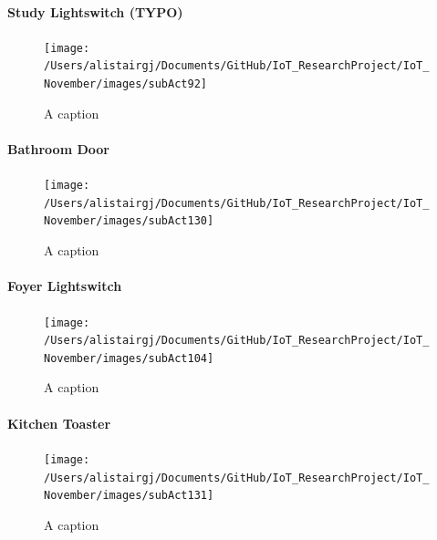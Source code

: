 \documentclass[11pt,]{article}
\let\oldparagraph\paragraph
\renewcommand{\paragraph}[1]{\oldparagraph{#1}\mbox{}}
\begin{document}
\hypertarget{study-lightswitch-typo}{%
\paragraph{Study Lightswitch (TYPO)}\label{study-lightswitch-typo}}

\begin{figure}[H]

{\centering \texttt{[image: /Users/alistairgj/Documents/GitHub/IoT\_ResearchProject/IoT\_November/images/subAct92]} 

}

\caption{A caption}\label{fig:subAct92}
\end{figure}

\hypertarget{bathroom-door}{%
\paragraph{Bathroom Door}\label{bathroom-door}}

\begin{figure}[H]

{\centering \texttt{[image: /Users/alistairgj/Documents/GitHub/IoT\_ResearchProject/IoT\_November/images/subAct130]} 

}

\caption{A caption}\label{fig:subAct130}
\end{figure}

\hypertarget{foyer-lightswitch}{%
\paragraph{Foyer Lightswitch}\label{foyer-lightswitch}}

\begin{figure}[H]

{\centering \texttt{[image: /Users/alistairgj/Documents/GitHub/IoT\_ResearchProject/IoT\_November/images/subAct104]} 

}

\caption{A caption}\label{fig:subAct104}
\end{figure}

\hypertarget{kitchen-toaster}{%
\paragraph{Kitchen Toaster}\label{kitchen-toaster}}

\begin{figure}[H]

{\centering \texttt{[image: /Users/alistairgj/Documents/GitHub/IoT\_ResearchProject/IoT\_November/images/subAct131]} 

}

\caption{A caption}\label{fig:subAct131}
\end{figure}
\end{document}
